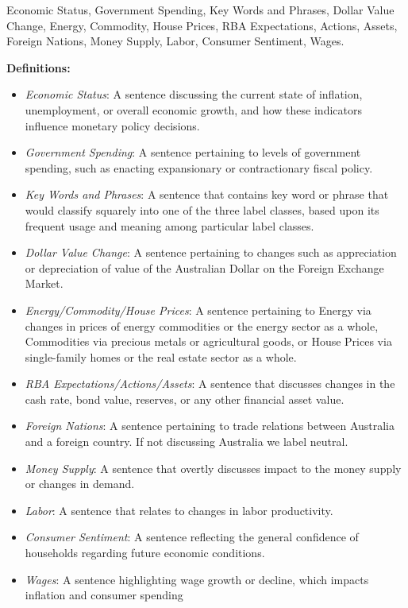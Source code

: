  Economic Status, Government Spending, Key Words and Phrases, Dollar Value Change, Energy, Commodity, House Prices, RBA Expectations, Actions, Assets, Foreign Nations, Money Supply, Labor, Consumer Sentiment, Wages.


\textbf{Definitions:}
\begin{itemize}
    \item \textit{Economic Status}: A sentence discussing the current state of inflation, unemployment, or overall economic growth, and how these indicators influence monetary policy decisions.

    \item \textit{Government Spending}: A sentence pertaining to levels of government spending, such as enacting expansionary or contractionary fiscal policy.

    \item \textit{Key Words and Phrases}: A sentence that contains key word or phrase that would classify squarely into one of the three label classes, based upon its frequent usage and meaning among particular label classes.

    \item \textit{Dollar Value Change}: A sentence pertaining to changes such as appreciation or depreciation of value of the Australian Dollar on the Foreign Exchange Market.

    \item \textit{Energy/Commodity/House Prices}: A sentence pertaining to Energy via changes in prices of energy commodities or the energy sector as a whole, Commodities via precious metals or agricultural goods, or House Prices via single-family homes or the real estate sector as a whole.

    \item \textit{RBA Expectations/Actions/Assets}: A sentence that discusses changes in the cash rate, bond value, reserves, or any other financial asset value.

    \item \textit{Foreign Nations}: A sentence pertaining to trade relations between Australia and a foreign country. If not discussing Australia we label neutral.

    \item \textit{Money Supply}: A sentence that overtly discusses impact to the money supply or changes in demand.

    \item \textit{Labor}: A sentence that relates to changes in labor productivity.

    \item \textit{Consumer Sentiment}: A sentence reflecting the general confidence of households regarding future economic conditions.

    \item \textit{Wages}: A sentence highlighting wage growth or decline, which impacts inflation and consumer spending
\end{itemize}




